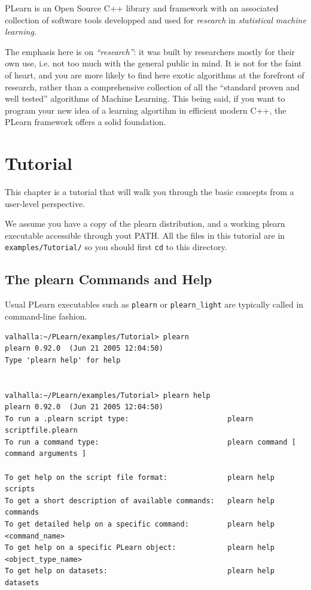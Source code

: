 \documentclass[11pt]{book}
\begin{document}
PLearn is an Open Source C++ library and framework with an associated
collection of software tools developped and used for \emph{research} in
\emph{statistical machine learning.} 

The emphasis here is on \emph{``research''}: it was built by researchers
mostly for their own use, i.e. not too much with the general public in
mind. It is not for the faint of heart, and you are more likely to
find here exotic algorithms at the forefront of research, rather than a
comprehensive collection of all the ``standard proven and well tested''
algorithms of Machine Learning. This being said, if you want to program
your new idea of a learning algortihm in efficient modern C++, the PLearn
framework offers a solid foundation.


\chapter{Tutorial}

This chapter is a tutorial that will walk you through the basic concepts from a user-level perspective.

We assume you have a copy of the plearn distribution, and a working plearn
executable accessible through yout PATH. All the files in this tutorial are in \verb!examples/Tutorial/!
so you should first {\tt cd} to this directory.

\section{The plearn Commands and Help}

Usual PLearn executables such as \verb!plearn! or \verb!plearn_light! are
typically called in command-line fashion.

\begin{verbatim}
valhalla:~/PLearn/examples/Tutorial> plearn
plearn 0.92.0  (Jun 21 2005 12:04:50)
Type 'plearn help' for help


valhalla:~/PLearn/examples/Tutorial> plearn help
plearn 0.92.0  (Jun 21 2005 12:04:50)
To run a .plearn script type:                       plearn scriptfile.plearn
To run a command type:                              plearn command [ command arguments ]

To get help on the script file format:              plearn help scripts
To get a short description of available commands:   plearn help commands
To get detailed help on a specific command:         plearn help <command_name>
To get help on a specific PLearn object:            plearn help <object_type_name>
To get help on datasets:                            plearn help datasets
\end{verbatim}
\end{document}
